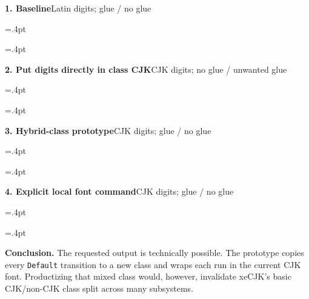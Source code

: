 \documentclass[11pt]{article}
\newcommand\Cell[1]{\colorbox{white}{\fboxsep=5pt\fboxrule=.4pt\fbox{\strut#1}}}
\newcommand\Result[5]{%
  \noindent\colorbox{#1}{%
    \parbox{\dimexpr\linewidth-2\fboxsep\relax}{%
      \textbf{#2}\hfill\small #3\par\vspace{2mm}
      \begin{minipage}[c]{.44\linewidth}\centering\Cell{\copy#4}\end{minipage}%
      \hfill
      \begin{minipage}[c]{.44\linewidth}\centering\Cell{\copy#5}\end{minipage}\par
    }}\par\vspace{2.2mm}}
\begin{document}
\Result{neutral}{1. Baseline}{Latin digits; glue / no glue}{\DefaultCJK}{\DefaultLatin}
\Result{bad}{2. Put digits directly in class CJK}{CJK digits; no glue / unwanted glue}{\DirectCJK}{\DirectLatin}
\Result{good}{3. Hybrid-class prototype}{CJK digits; glue / no glue}{\HybridCJK}{\HybridLatin}
\Result{good}{4. Explicit local font command}{CJK digits; glue / no glue}{\ExplicitCJK}{\ExplicitLatin}

\vfill
{\small\color{heading}\textbf{Conclusion.}}
The requested output is technically possible. The prototype copies every
\texttt{Default} transition to a new class and wraps each run in the current
CJK font. Productizing that mixed class would, however, invalidate xeCJK's
basic CJK/non-CJK class split across many subsystems.
\end{document}
